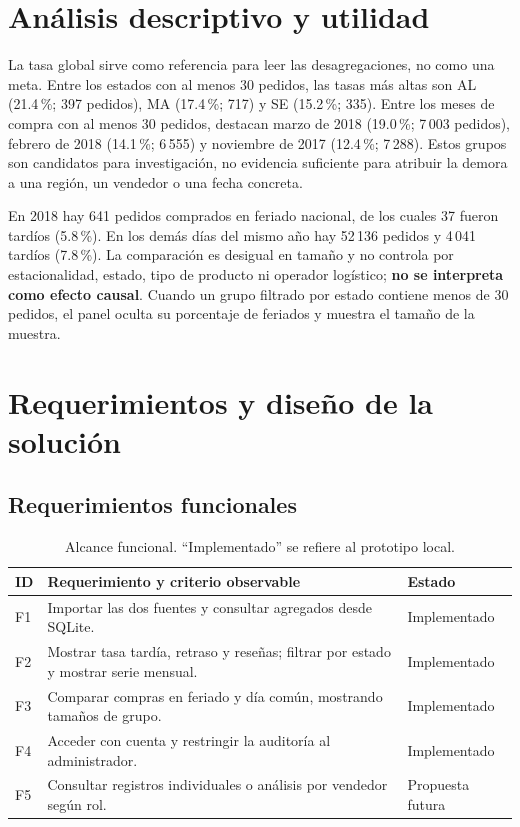 \documentclass[12pt,a4paper]{article}
\begin{document}
\section{Análisis descriptivo y utilidad}
La tasa global sirve como referencia para leer las desagregaciones, no como una meta. Entre los estados con al menos 30 pedidos, las tasas más altas son AL (21.4\,\%; 397 pedidos), MA (17.4\,\%; 717) y SE (15.2\,\%; 335). Entre los meses de compra con al menos 30 pedidos, destacan marzo de 2018 (19.0\,\%; 7\,003 pedidos), febrero de 2018 (14.1\,\%; 6\,555) y noviembre de 2017 (12.4\,\%; 7\,288). Estos grupos son candidatos para investigación, no evidencia suficiente para atribuir la demora a una región, un vendedor o una fecha concreta.

En 2018 hay 641 pedidos comprados en feriado nacional, de los cuales 37 fueron tardíos (5.8\,\%). En los demás días del mismo año hay 52\,136 pedidos y 4\,041 tardíos (7.8\,\%). La comparación es desigual en tamaño y no controla por estacionalidad, estado, tipo de producto ni operador logístico; \textbf{no se interpreta como efecto causal}. Cuando un grupo filtrado por estado contiene menos de 30 pedidos, el panel oculta su porcentaje de feriados y muestra el tamaño de la muestra.

\section{Requerimientos y diseño de la solución}
\subsection{Requerimientos funcionales}
\begin{table}[H]
\centering\small
\begin{tabularx}{\textwidth}{P{1.1cm}Y P{2.4cm}}
\toprule
ID & Requerimiento y criterio observable & Estado\\
\midrule
F1 & Importar las dos fuentes y consultar agregados desde SQLite. & Implementado\\
F2 & Mostrar tasa tardía, retraso y reseñas; filtrar por estado y mostrar serie mensual. & Implementado\\
F3 & Comparar compras en feriado y día común, mostrando tamaños de grupo. & Implementado\\
F4 & Acceder con cuenta y restringir la auditoría al administrador. & Implementado\\
F5 & Consultar registros individuales o análisis por vendedor según rol. & Propuesta futura\\
\bottomrule
\end{tabularx}
\caption{Alcance funcional. ``Implementado'' se refiere al prototipo local.}
\end{table}
\end{document}
